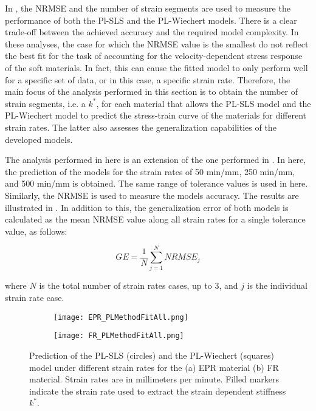 In , the NRMSE and the number of strain segments are used to measure the performance of both the Pl-SLS and the PL-Wiechert models. There is a clear trade-off between the achieved accuracy and the required model complexity. In these analyses, the case for which the NRMSE value is the smallest do not reflect the best fit for the task of accounting for the velocity-dependent stress response of the soft materials. In fact, this can cause the fitted model to only perform well for a specific set of data, or in this case, a specific strain rate. Therefore, the main focus of the analysis performed in this section is to obtain the number of strain segments, i.e. a $k^*$, for each material that allows the PL-SLS model and the PL-Wiechert model to predict the stress-train curve of the materials for different strain rates. The latter also assesses the generalization capabilities of the developed models.

The analysis performed in here is an extension of the one performed in . In here, the prediction of the models for the strain rates of 50 min/mm, 250 min/mm, and 500 min/mm is obtained. The same range of tolerance values is used in here. Similarly, the NRMSE is used to measure the models accuracy. The results are illustrated in . In addition to this, the generalization error of both models is calculated as the mean NRMSE value along all strain rates for a single tolerance value, as follows:


\begin{equation}
	\label{eqGE}
	GE = \frac{1}{N}\sum_{j=1}^{N} NRMSE_j
\end{equation}

\noindent where $N$ is the total number of strain rates cases, up to 3, and $j$ is the individual strain rate case.


\begin{figure}[H]
	\centering
	\begin{subfigure}[b]{0.9\textwidth}
		\centering
		\texttt{[image: EPR\_PLMethodFitAll.png]}
		\caption{}
		\label{fig:FitAllEPR}
	\end{subfigure}
	\begin{subfigure}[b]{0.9\textwidth}
		\centering
		\texttt{[image: FR\_PLMethodFitAll.png]}
		\caption{}
		\label{fig:FitAllFR}
	\end{subfigure}
	\caption{Prediction of the PL-SLS (circles) and the PL-Wiechert (squares) model under different strain rates for the (a) EPR material (b) FR material. Strain rates are in millimeters per minute. Filled markers indicate the strain rate used to extract the strain dependent stiffness $k^*$. }
	\label{fig:FitAllEPR_FR}
\end{figure}

